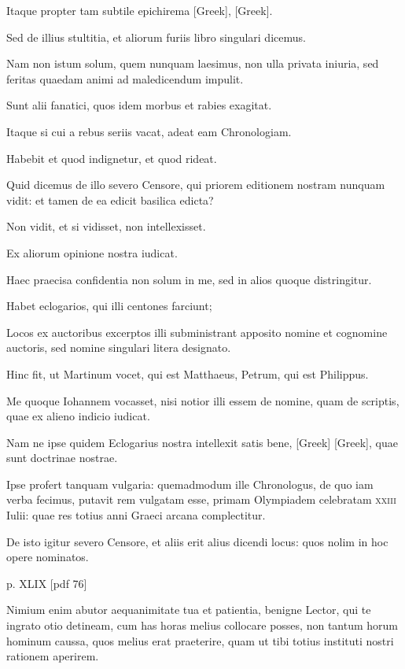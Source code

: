 \begin{parnumbers}
Itaque propter tam subtile epichirema \textgreek{[Greek]}, \textgreek{[Greek]}.

Sed de illius stultitia, et aliorum furiis libro singulari dicemus.

Nam non istum solum, quem nunquam laesimus, non ulla privata iniuria,
sed feritas quaedam animi ad maledicendum impulit.

Sunt alii
fanatici, quos idem morbus et rabies exagitat.

Itaque si cui a rebus
seriis vacat, adeat eam Chronologiam.

Habebit et quod indignetur,
et quod rideat.

Quid dicemus de illo severo Censore, qui priorem
editionem nostram nunquam vidit: et tamen de ea edicit basilica
edicta?

Non vidit, et si vidisset, non intellexisset.

Ex aliorum opinione
nostra iudicat.

Haec praecisa confidentia non solum in me,
sed in alios quoque distringitur.

Habet eclogarios, qui illi centones
farciunt;

Locos ex auctoribus excerptos illi subministrant apposito
nomine et cognomine auctoris, sed nomine singulari litera designato.

Hinc fit, ut Martinum vocet, qui est Matthaeus, Petrum, qui est
Philippus.

Me quoque Iohannem vocasset, nisi notior illi essem de
nomine, quam de scriptis, quae ex alieno indicio iudicat.

Nam
ne ipse quidem Eclogarius nostra intellexit satis bene, \textgreek{[Greek]}
\textgreek{[Greek]}, quae sunt doctrinae nostrae.

Ipse profert tanquam vulgaria: quemadmodum ille Chronologus, de quo iam
verba fecimus, putavit rem vulgatam esse, primam Olympiadem
celebratam \textsc{xxiii} Iulii:
 quae res totius anni Graeci arcana complectitur.

De isto igitur severo Censore, et aliis erit alius dicendi locus:
quos nolim in hoc opere nominatos.

\clearpage
p. XLIX [pdf 76]

Nimium enim abutor aequanimitate
tua et patientia, benigne Lector, qui te ingrato otio detineam,
cum has horas melius collocare posses, non tantum horum
hominum caussa, quos melius erat praeterire, quam ut tibi totius instituti
nostri rationem aperirem.


\end{parnumbers}
